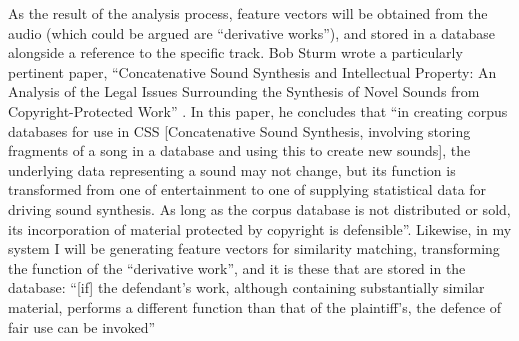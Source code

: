 As the result of the analysis process, feature vectors will be obtained from the
audio (which could be argued are ``derivative works''), and stored in a database
alongside a reference to the specific track. Bob Sturm wrote a particularly
pertinent paper, ``Concatenative Sound Synthesis and Intellectual Property: An
Analysis of the Legal Issues Surrounding the Synthesis of Novel Sounds from
Copyright-Protected Work'' \citep{Sturm2006}. In this paper, he concludes that
``in creating corpus databases for use in CSS [Concatenative Sound
Synthesis, involving storing fragments of a song in a database and
using this to create new sounds], the underlying data representing a
sound may not change, but its function is transformed from one of
entertainment to one of supplying statistical data for driving sound
synthesis. As long as the corpus database is not distributed or sold,
its incorporation of material protected by copyright is defensible''.
Likewise, in my system I will be generating feature vectors for similarity matching, transforming the function of the ``derivative work'', and it is these that are stored in the database: ``[if] the defendant's work, although containing
substantially similar material, performs a different function than that of the
plaintiff's, the defence of fair use can be invoked'' \citep{Copyright1988}
